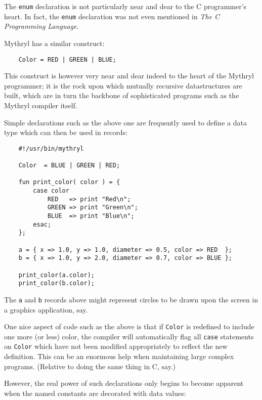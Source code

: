 The {\tt enum} declaration is not particularly near and dear to the 
C programmer's heart.  In fact, the {\tt enum} declaration was not 
even mentioned in {\it The C Programming Language}.

Mythryl has a similar construct:

\begin{verbatim}
    Color = RED | GREEN | BLUE;
\end{verbatim}

This construct is however very near and dear indeed to the heart of 
the Mythryl programmer;  it is the rock upon which mutually recursive 
datastructures are built, which are in turn the backbone of  
sophisticated programs such as the Mythryl compiler itself.

Simple declarations such as the above one are frequently used to define 
a data type which can then be used in records:

\begin{verbatim}
    #!/usr/bin/mythryl

    Color  = BLUE | GREEN | RED;

    fun print_color( color ) = {
        case color
            RED   => print "Red\n";
            GREEN => print "Green\n";
            BLUE  => print "Blue\n";
        esac;
    };

    a = { x => 1.0, y => 1.0, diameter => 0.5, color => RED  };
    b = { x => 1.0, y => 2.0, diameter => 0.7, color => BLUE };

    print_color(a.color);
    print_color(b.color);
\end{verbatim}

The {\tt a} and {\tt b} records above might represent circles to be 
drawn upon the screen in a graphics application, say.

One nice aspect of code such as the above is that if {\tt Color} is 
redefined to include one more (or less) color, the compiler will 
automatically flag all {\tt case} statements on {\tt Color} which have not 
been modified appropriately to reflect the new definition.  This 
can be an enormous help when maintaining large complex programs. 
(Relative to doing the same thing in C, say.)

However, the real power of such declarations only begins to become 
apparent when the named constants are decorated with data values:

